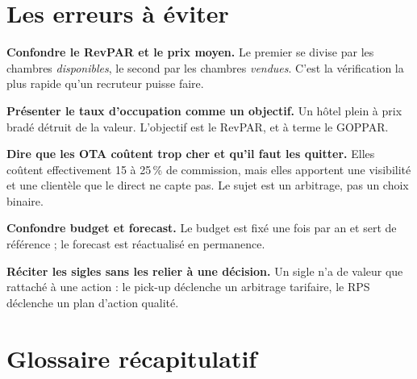\documentclass[11pt,a4paper]{article}
\begin{document}
\section{Les erreurs à éviter}

\textbf{Confondre le RevPAR et le prix moyen.} Le premier se divise par les chambres \emph{disponibles}, le second par les chambres \emph{vendues}. C'est la vérification la plus rapide qu'un recruteur puisse faire.

\textbf{Présenter le taux d'occupation comme un objectif.} Un hôtel plein à prix bradé détruit de la valeur. L'objectif est le RevPAR, et à terme le GOPPAR.

\textbf{Dire que les OTA coûtent trop cher et qu'il faut les quitter.} Elles coûtent effectivement 15 à 25\,\% de commission, mais elles apportent une visibilité et une clientèle que le direct ne capte pas. Le sujet est un arbitrage, pas un choix binaire.

\textbf{Confondre budget et forecast.} Le budget est fixé une fois par an et sert de référence ; le forecast est réactualisé en permanence.

\textbf{Réciter les sigles sans les relier à une décision.} Un sigle n'a de valeur que rattaché à une action : le pick-up déclenche un arbitrage tarifaire, le RPS déclenche un plan d'action qualité.

\section{Glossaire récapitulatif}
\end{document}

